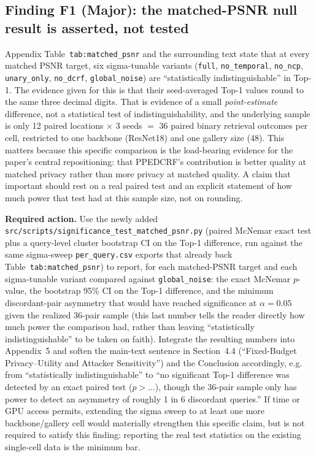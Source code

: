 \documentclass[11pt]{article}
\begin{document}
\subsection*{Finding F1 (Major): the matched-PSNR null result is asserted, not tested}
\label{sec:f1}
Appendix Table~\texttt{tab:matched\_psnr} and the surrounding text state that
at every matched PSNR target, six sigma-tunable variants (\texttt{full},
\texttt{no\_temporal}, \texttt{no\_ncp}, \texttt{unary\_only},
\texttt{no\_dcrf}, \texttt{global\_noise}) are ``statistically
indistinguishable'' in Top-1. The evidence given for this is that their
seed-averaged Top-1 values round to the same three decimal digits. That is
evidence of a small \emph{point-estimate} difference, not a statistical test
of indistinguishability, and the underlying sample is only 12 paired
locations $\times$ 3 seeds $=$ 36 paired binary retrieval outcomes per cell,
restricted to one backbone (ResNet18) and one gallery size (48). This matters
because this specific comparison is the load-bearing evidence for the
paper's central repositioning: that PPEDCRF's contribution is better quality
at matched privacy rather than more privacy at matched quality. A claim that
important should rest on a real paired test and an explicit statement of how
much power that test had at this sample size, not on rounding.

\textbf{Required action.} Use the newly added
\texttt{src/scripts/significance\_test\_matched\_psnr.py} (paired McNemar
exact test plus a query-level cluster bootstrap CI on the Top-1 difference,
run against the same sigma-sweep \texttt{per\_query.csv} exports that already
back Table~\texttt{tab:matched\_psnr}) to report, for each matched-PSNR
target and each sigma-tunable variant compared against \texttt{global\_noise}:
the exact McNemar $p$-value, the bootstrap 95\% CI on the Top-1 difference,
and the minimum discordant-pair asymmetry that would have reached
significance at $\alpha=0.05$ given the realized 36-pair sample (this last
number tells the reader directly how much power the comparison had, rather
than leaving ``statistically indistinguishable'' to be taken on faith).
Integrate the resulting numbers into Appendix~5 and soften the main-text
sentence in Section~4.4 (``Fixed-Budget Privacy--Utility and Attacker
Sensitivity'') and the Conclusion accordingly, e.g. from ``statistically
indistinguishable'' to ``no significant Top-1 difference was detected by an
exact paired test ($p>\ldots$), though the 36-pair sample only has power to
detect an asymmetry of roughly 1 in 6 discordant queries.'' If time or GPU
access permits, extending the sigma sweep to at least one more
backbone/gallery cell would materially strengthen this specific claim, but
is not required to satisfy this finding: reporting the real test statistics
on the existing single-cell data is the minimum bar.
\end{document}

